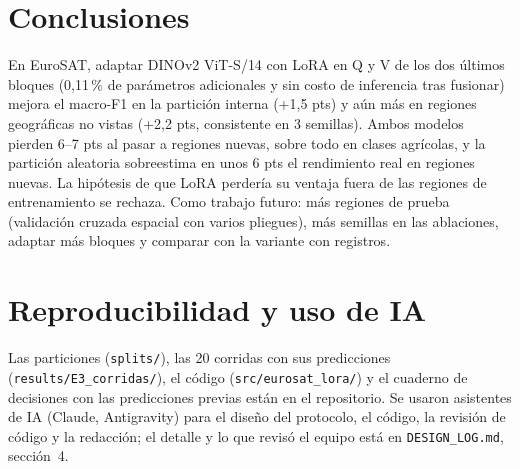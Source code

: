 \documentclass[conference,a4paper]{IEEEtran}
\begin{document}
\section{Conclusiones}
En EuroSAT, adaptar DINOv2 ViT-S/14 con LoRA en Q y V de los dos últimos bloques (0{,}11\,\% de parámetros adicionales y sin costo de inferencia tras fusionar) mejora el macro-F1 en la partición interna (+1{,}5 pts) y aún más en regiones geográficas no vistas (+2{,}2 pts, consistente en 3 semillas). Ambos modelos pierden 6--7 pts al pasar a regiones nuevas, sobre todo en clases agrícolas, y la partición aleatoria sobreestima en unos 6 pts el rendimiento real en regiones nuevas. La hipótesis de que LoRA perdería su ventaja fuera de las regiones de entrenamiento se rechaza. Como trabajo futuro: más regiones de prueba (validación cruzada espacial con varios pliegues), más semillas en las ablaciones, adaptar más bloques y comparar con la variante con registros.

\section*{Reproducibilidad y uso de IA}
Las particiones (\texttt{splits/}), las 20 corridas con sus predicciones (\texttt{results/E3\_corridas/}), el código (\texttt{src/eurosat\_lora/}) y el cuaderno de decisiones con las predicciones previas están en el repositorio. Se usaron asistentes de IA (Claude, Antigravity) para el diseño del protocolo, el código, la revisión de código y la redacción; el detalle y lo que revisó el equipo está en \texttt{DESIGN\_LOG.md}, sección~4.
\end{document}
